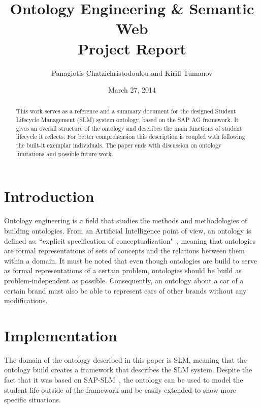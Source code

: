 \documentclass{article}    %
\title{Ontology Engineering \& Semantic Web \\ Project Report}  %
\author{Panagiotis Chatzichristodoulou and Kirill Tumanov}    %
\date{March 27, 2014}   %
\begin{document}
%
\maketitle                 %
%
\begin{abstract}
%
This work serves as a reference and a summary document for the designed Student Lifecycle Management (SLM) system ontology, based on the SAP AG framework. It gives an overall structure of the ontology and describes the main functions of student lifecycle it reflects. For better comprehension this description is coupled with following the built-it exemplar individuals. The paper ends with discussion on ontology limitations and possible future work.
%
\end{abstract}
%
% 
\section{Introduction}
%
Ontology engineering is a field that studies the methods and methodologies of building ontologies. From an Artificial Intelligence point of view, an ontology is defined as: ``explicit specification of conceptualization"~\cite{Gruber}, meaning that ontologies are formal representations of sets of concepts and the relations between them within a domain. It must be noted that even though ontologies are build to serve as formal representations of a certain problem, ontologies should be build as problem-independent as possible. Consequently, an ontology about a car of a certain brand must also be able to represent cars of other brands without any modifications. 
% 
\section{Implementation}
%
The domain of the ontology described in this paper is SLM, meaning that the ontology build creates a framework that describes the SLM system. Despite the fact that it was based on SAP-SLM~\cite{sap}, the ontology can be used to model the student life outside of the framework and be easily extended to show more specific situations.
\end{document}
